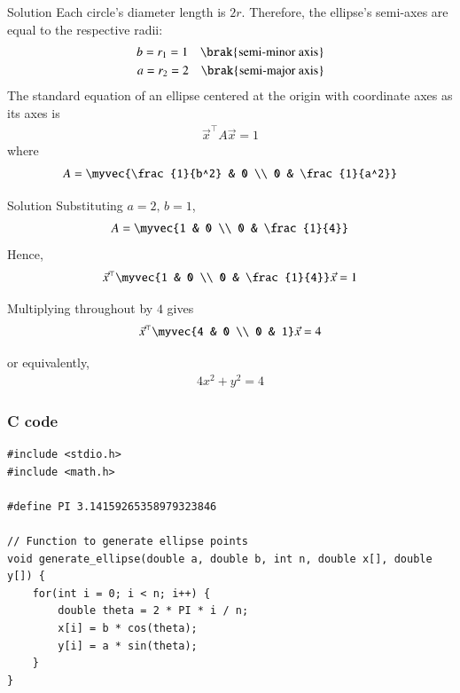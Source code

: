 \documentclass{beamer}
\begin{document}
\begin{frame}{Solution}
Each circle's diameter length is $2r$. Therefore, the ellipse's 
semi-axes are equal to the respective radii:
\begin{align}
    b = r_1 = 1 \quad \text{\brak{\text{semi-minor axis}}}\\
    a = r_2 = 2 \quad \text{\brak{\text{semi-major axis}}}
\end{align}
The standard equation of an ellipse centered at the origin with coordinate axes as its axes is
\begin{align}
    \vec{x}^\top A \vec{x} = 1
\end{align}
where
\begin{align}
    A = \myvec{\frac{1}{b^2} & 0 \\ 0 & \frac{1}{a^2}}
\end{align}
\end{frame}

\begin{frame}{Solution}
Substituting $a = 2,\, b = 1$,
\begin{align}
    A = \myvec{1 & 0 \\ 0 & \frac{1}{4}}
\end{align}
Hence,
\begin{align}
    \vec{x}^\top\myvec{1 & 0 \\ 0 & \frac{1}{4}}\vec{x} = 1
\end{align}

Multiplying throughout by $4$ gives
\begin{align}
    \vec{x}^\top\myvec{4 & 0 \\ 0 & 1}\vec{x} = 4
\end{align}

or equivalently,
\begin{align}
    4x^2 + y^2 = 4
\end{align}
\end{frame}

\begin{frame}[fragile]
    \frametitle{C code}
    \begin{lstlisting}
#include <stdio.h>
#include <math.h>

#define PI 3.14159265358979323846

// Function to generate ellipse points
void generate_ellipse(double a, double b, int n, double x[], double y[]) {
    for(int i = 0; i < n; i++) {
        double theta = 2 * PI * i / n;
        x[i] = b * cos(theta);
        y[i] = a * sin(theta);
    }
}
    \end{lstlisting}
\end{frame}
\end{document}
